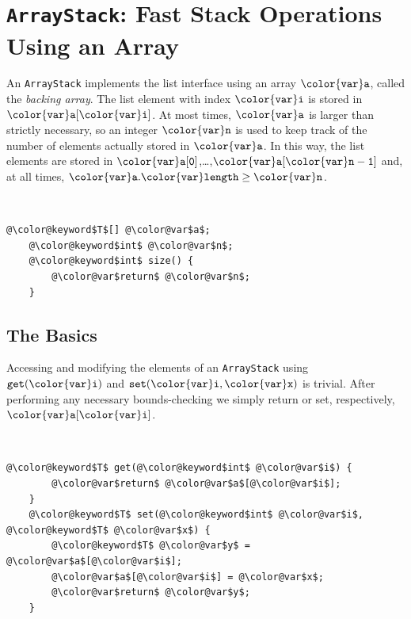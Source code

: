 \documentclass[10pt]{book}
\newcommand{\seclabel}[1]{\label{sec:#1}}
\theoremstyle{plain}
\theoremstyle{definition}
\begin{document}
\section{\texttt{ArrayStack}: Fast Stack Operations Using an Array}
\seclabel{arraystack}

%
An \texttt{ArrayStack} implements the list interface using an array \ensuremath{\mathtt{{\color{var}a}}}, called
the \emph{backing array}.  The list element with index \ensuremath{\mathtt{{\color{var}i}}} is stored
in \ensuremath{\mathtt{{\color{var}a}[{\color{var}i}]}}.  At most times, \ensuremath{\mathtt{{\color{var}a}}} is larger than strictly necessary,
so an integer \ensuremath{\mathtt{{\color{var}n}}} is used to keep track of the number of elements
actually stored in \ensuremath{\mathtt{{\color{var}a}}}.  In this way, the list elements are stored in
\ensuremath{\mathtt{{\color{var}a}[0]}},\ldots,\ensuremath{\mathtt{{\color{var}a}[{\color{var}n}-1]}} and, at all times, $\ensuremath{\mathtt{{\color{var}a}.{\color{var}length}}} \ge \ensuremath{\mathtt{{\color{var}n}}}$.



 \ \vspace{.5ex}\begin{Verbatim}[gobble=1,tabsize=2,frame=single,framerule=1.2pt,commandchars=\\@\$,label=\texttt{ArrayStack},labelposition=topline]
	@\color@keyword$T$[] @\color@var$a$;
	@\color@keyword$int$ @\color@var$n$;
	@\color@keyword$int$ size() {
		@\color@var$return$ @\color@var$n$;
	}
\end{Verbatim}


\subsection{The Basics}

Accessing and modifying the elements of an \texttt{ArrayStack} using \ensuremath{\mathtt{get({\color{var}i})}}
and \ensuremath{\mathtt{set({\color{var}i},{\color{var}x})}} is trivial. After performing any necessary bounds-checking
we simply return or set, respectively, \ensuremath{\mathtt{{\color{var}a}[{\color{var}i}]}}.



 \ \vspace{.5ex}\begin{Verbatim}[gobble=1,tabsize=2,frame=single,framerule=1.2pt,commandchars=\\@\$,label=\texttt{ArrayStack},labelposition=topline]
	@\color@keyword$T$ get(@\color@keyword$int$ @\color@var$i$) {
		@\color@var$return$ @\color@var$a$[@\color@var$i$];
	}
	@\color@keyword$T$ set(@\color@keyword$int$ @\color@var$i$, @\color@keyword$T$ @\color@var$x$) {
		@\color@keyword$T$ @\color@var$y$ = @\color@var$a$[@\color@var$i$];
		@\color@var$a$[@\color@var$i$] = @\color@var$x$;
		@\color@var$return$ @\color@var$y$;
	}
\end{Verbatim}
\end{document}
